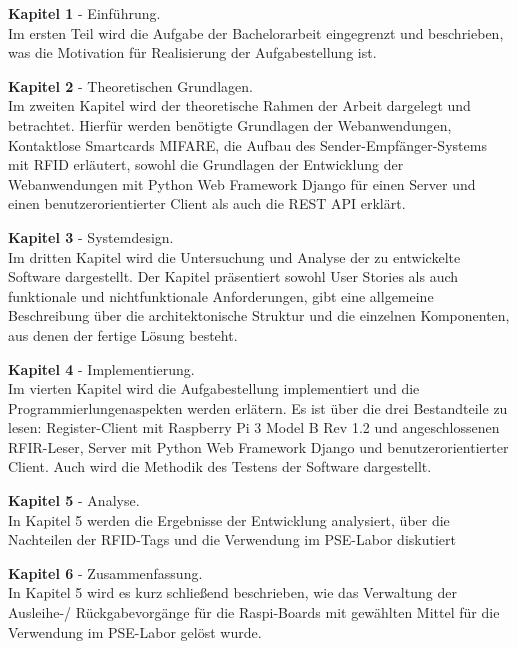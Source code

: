 \textbf{Kapitel 1} - Einführung.\\
Im ersten Teil wird die Aufgabe der Bachelorarbeit eingegrenzt und beschrieben, was die Motivation für Realisierung der Aufgabestellung ist. 

\textbf{Kapitel 2} - Theoretischen Grundlagen.\\ 
Im zweiten Kapitel wird der theoretische Rahmen der Arbeit dargelegt und betrachtet. Hierfür
werden benötigte Grundlagen der Webanwendungen, Kontaktlose Smartcards MIFARE, die Aufbau des Sender-Empfänger-Systems mit RFID erläutert, sowohl die Grundlagen der Entwicklung der Webanwendungen mit Python Web Framework Django für einen Server und einen benutzerorientierter Client als auch die REST API erklärt.

\textbf{Kapitel 3} - Systemdesign.\\
Im dritten Kapitel wird die Untersuchung und Analyse der zu entwickelte Software dargestellt. Der Kapitel präsentiert sowohl User Stories als auch funktionale und nichtfunktionale Anforderungen, gibt eine allgemeine Beschreibung über die architektonische Struktur und die einzelnen Komponenten, aus denen der fertige Lösung besteht.

\textbf{Kapitel 4} - Implementierung.\\
Im vierten Kapitel wird die Aufgabestellung implementiert und die Programmierlungenaspekten werden erlätern. Es ist über die drei Bestandteile zu lesen: Register-Client mit Raspberry Pi 3 Model B Rev 1.2 und angeschlossenen RFIR-Leser, Server mit Python Web Framework Django und benutzerorientierter Client. Auch wird die Methodik des Testens der Software dargestellt.

\textbf{Kapitel 5} - Analyse.\\
In Kapitel 5 werden die Ergebnisse der Entwicklung analysiert, über die Nachteilen der RFID-Tags und die Verwendung im PSE-Labor diskutiert 

\textbf{Kapitel 6} - Zusammenfassung.\\
In Kapitel 5 wird es kurz schließend beschrieben, wie das Verwaltung der Ausleihe-/ Rückgabevorgänge für die Raspi-Boards mit gewählten Mittel für die Verwendung im PSE-Labor gelöst wurde. 

